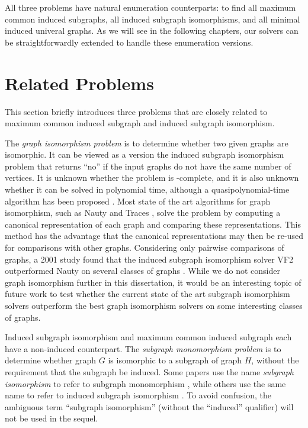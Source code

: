 All three problems have natural enumeration counterparts:
to find all maximum common induced subgraphs, all induced subgraph isomorphisms,
and all minimal induced univeral graphs.  As we will see in the following
chapters, our solvers can be straightforwardly extended to handle
these enumeration versions.

\section{Related Problems}\label{sec:related-problems}

This section briefly introduces three problems that are closely related to
maximum common induced subgraph and induced subgraph isomorphism.

The \emph{graph isomorphism problem} is to determine whether two given graphs are
isomorphic. It can be viewed as a version the induced subgraph isomorphism
problem that returns ``no'' if the input graphs do not have the same number of
vertices.  It is unknown whether the problem is \NP-complete, and it is also
unknown whether it can be solved in polynomial time, although a
quasipolynomial-time algorithm has been proposed
\citep{DBLP:conf/stoc/Babai16}.  Most state of the art algorithms for graph
isomorphism, such as Nauty and Traces \citep{DBLP:journals/jsc/McKayP14}, solve the problem by computing a
canonical representation of each graph and comparing these representations.
This method has the advantage that the canonical
representations may then be re-used for comparisons with other graphs.
Considering only pairwise comparisons of graphs, a 2001 study found that the
induced subgraph isomorphism solver VF2 outperformed Nauty on several classes
of graphs \citep{foggia2001performance}.  While we do not consider graph
isomorphism further in this dissertation, it would be an interesting topic of
future work to test whether the current state of the art subgraph isomorphism
solvers outperform the best graph isomorphism solvers on some interesting
classes of graphs.

Induced subgraph isomorphism and maximum common induced subgraph each have a
non-induced counterpart. The \emph{subgraph monomorphism problem} is to
determine whether graph $G$ is isomorphic to a subgraph of graph $H$, without
the requirement that the subgraph be induced.  Some papers use the name
\emph{subgraph isomorphism} to refer to subgraph monomorphism
\citep{DBLP:conf/cp/McCreeshP15}, while others use the same name to refer to induced
subgraph isomorphism \citep{DBLP:journals/pami/CarlettiFSV18}.  To avoid
confusion, the ambiguous term ``subgraph isomorphism'' (without the ``induced''
qualifier) will not be used in the sequel.

